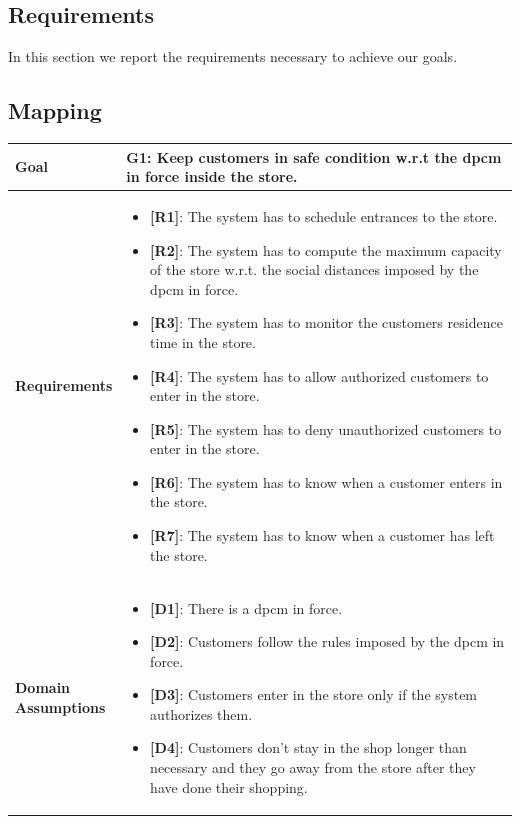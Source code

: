 \subsection{Requirements}

In this section we report the requirements necessary to achieve our goals.

\subsection{Mapping}

\begin{table}[H]
\centering
\begin{tabular}{| m{} | m{} |} 
	\hline
	\textbf{Goal} &
		\textbf{G1: Keep customers in safe condition w.r.t the \gls{dpcm} in force inside the store.} \\
	\hline
	\textbf{Requirements} &
		\begin{itemize}
			\item {\textbf{[R1]}}: The system has to schedule entrances to the store.
			\item {\textbf{[R2]}}: The system has to compute the maximum capacity of the store w.r.t. the social distances imposed by the \gls{dpcm} in force.
			\item {\textbf{[R3]}}: The system has to monitor the customers residence time in the store.
			\item {\textbf{[R4]}}: The system has to allow authorized customers to enter in the store.
			\item {\textbf{[R5]}}: The system has to deny unauthorized customers to enter in the store.
			\item {\textbf{[R6]}}: The system has to know when a customer enters in the store.
			\item {\textbf{[R7]}}: The system has to know when a customer has left the store.
		\end{itemize} \\
	\hline
	\shortstack[l]{\textbf{Domain} \\ \textbf{Assumptions}} & 
		\begin{itemize}
			\item {\textbf{[D1]}}: There is a \gls{dpcm} in force.
			\item {\textbf{[D2]}}: Customers follow the rules imposed by the \gls{dpcm} in force.
			\item {\textbf{[D3]}}: Customers enter in the store only if the system authorizes them.
			\item {\textbf{[D4]}}: Customers don't stay in the shop longer than necessary and they go away from the store after they have done their shopping.
		\end{itemize} \\ 
	\hline
\end{tabular}
\end{table}


